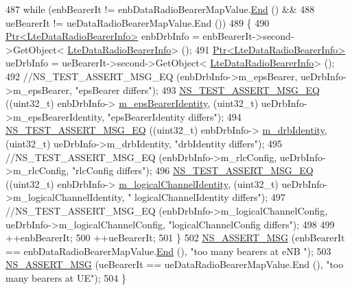 \begin{DoxyCode}
487   \textcolor{keywordflow}{while} (enbBearerIt != enbDataRadioBearerMapValue.\hyperlink{classns3_1_1ObjectPtrContainerValue_a45b7448cf99d2629260c21f740b904d0}{End} () &&
488          ueBearerIt != ueDataRadioBearerMapValue.End ())
489     \{
490       \hyperlink{classns3_1_1Ptr}{Ptr<LteDataRadioBearerInfo>} enbDrbInfo = enbBearerIt->second->GetObject<
      \hyperlink{classns3_1_1LteDataRadioBearerInfo}{LteDataRadioBearerInfo}> ();
491       \hyperlink{classns3_1_1Ptr}{Ptr<LteDataRadioBearerInfo>} ueDrbInfo = ueBearerIt->second->GetObject<
      \hyperlink{classns3_1_1LteDataRadioBearerInfo}{LteDataRadioBearerInfo}> ();
492       \textcolor{comment}{//NS\_TEST\_ASSERT\_MSG\_EQ (enbDrbInfo->m\_epsBearer, ueDrbInfo->m\_epsBearer, "epsBearer differs");}
493       \hyperlink{group__testing_ga2a9d78cffb3db8e867c35fff0b698cf5}{NS\_TEST\_ASSERT\_MSG\_EQ} ((uint32\_t) enbDrbInfo->
      \hyperlink{classns3_1_1LteDataRadioBearerInfo_ac5ff2de272b88aab06d6a1c34955bc0e}{m\_epsBearerIdentity}, (uint32\_t) ueDrbInfo->m\_epsBearerIdentity, \textcolor{stringliteral}{"epsBearerIdentity
       differs"});
494       \hyperlink{group__testing_ga2a9d78cffb3db8e867c35fff0b698cf5}{NS\_TEST\_ASSERT\_MSG\_EQ} ((uint32\_t) enbDrbInfo->
      \hyperlink{classns3_1_1LteDataRadioBearerInfo_a1f5a7e5404b41179c7519e6bbb168de1}{m\_drbIdentity}, (uint32\_t) ueDrbInfo->m\_drbIdentity, \textcolor{stringliteral}{"drbIdentity differs"});
495       \textcolor{comment}{//NS\_TEST\_ASSERT\_MSG\_EQ (enbDrbInfo->m\_rlcConfig, ueDrbInfo->m\_rlcConfig, "rlcConfig differs");}
496       \hyperlink{group__testing_ga2a9d78cffb3db8e867c35fff0b698cf5}{NS\_TEST\_ASSERT\_MSG\_EQ} ((uint32\_t) enbDrbInfo->
      \hyperlink{classns3_1_1LteDataRadioBearerInfo_a53a3b4d3b2eeda6e22c32d42163ae558}{m\_logicalChannelIdentity}, (uint32\_t) ueDrbInfo->m\_logicalChannelIdentity, \textcolor{stringliteral}{"
      logicalChannelIdentity differs"});
497       \textcolor{comment}{//NS\_TEST\_ASSERT\_MSG\_EQ (enbDrbInfo->m\_logicalChannelConfig, ueDrbInfo->m\_logicalChannelConfig,
       "logicalChannelConfig differs");}
498  
499       ++enbBearerIt;
500       ++ueBearerIt;
501     \}
502   \hyperlink{assert_8h_aff5ece9066c74e681e74999856f08539}{NS\_ASSERT\_MSG} (enbBearerIt == enbDataRadioBearerMapValue.\hyperlink{classns3_1_1ObjectPtrContainerValue_a45b7448cf99d2629260c21f740b904d0}{End} (), \textcolor{stringliteral}{"too many bearers at eNB
      "});
503   \hyperlink{assert_8h_aff5ece9066c74e681e74999856f08539}{NS\_ASSERT\_MSG} (ueBearerIt == ueDataRadioBearerMapValue.End (), \textcolor{stringliteral}{"too many bearers at UE"});  
504 \}
\end{DoxyCode}


